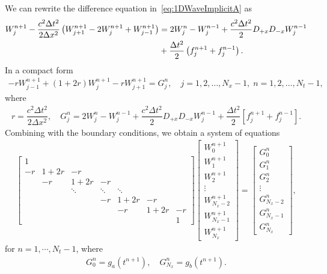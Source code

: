 \documentclass[11pt]{article}
\begin{document}
We can rewrite the difference equation in~\eqref{eq:1DWaveImplicitA} as
\begin{align}
W_j^{n+1}-\dfrac{c^2\Delta t^2}{2 \Delta x^2}\left (W_{j+1}^{n+1}-2W_{j}^{n+1}+W_{j-1}^{n+1}\right) & = 2W_j^n-W_j^{n-1}+\dfrac{c^2\Delta t^2}{2} D_{+x}D_{-x}W_j^{n-1}\\
&+\dfrac{\Delta t^2}{2}\left(f_j^{n+1}+f_{j}^{n-1}\right). \notag
\end{align}
In a compact form
\begin{align}
-rW_{j-1}^{n+1}+(1+2r)W_j^{n+1}-rW_{j+1}^{n+1}=G_j^n, \quad j=1,2,\dots,N_x-1,\; n=1,2,\dots,N_t-1,
\end{align}
where
\begin{align*}
r=\dfrac{c^2\Delta t^2}{2\Delta x^2},\quad G_j^n=2W_j^n-W_j^{n-1}+\dfrac{c^2\Delta t^2}{2} D_{+x}D_{-x}W_j^{n-1}+\dfrac{\Delta t^2}{2}\left[f_j^{n+1}+f_{j}^{n-1}\right].
\end{align*}
Combining with the boundary conditions, we obtain a system of equations
\begin{align}
\label{eq:1DWaveImplicitSystem}
\begin{bmatrix}
1 & & & & & & \\
-r & 1+2r & -r & & & &\\
& -r & 1+2r & -r & & & \\
& & \ddots & \ddots & \ddots & &\\
& & & -r & 1+2r & -r &\\
& & & & -r & 1+2r & -r\\
& & & & & & 1
\end{bmatrix}\begin{bmatrix}
W_0^{n+1}\\ W_1^{n+1}\\ W_2^{n+1}\\ \vdots \\ W_{N_x-2}^{n+1} \\W_{N_x-1}^{n+1} \\ W_{N_x}^{n+1}
\end{bmatrix}=\begin{bmatrix}
G_0^n \\ G_1^n \\ G_2^n \\ \vdots \\ G_{N_x-2}^n \\ G_{N_x-1}^n \\ G_{N_x}^n
\end{bmatrix},
\end{align}
for $n=1,\cdots, N_t-1$, where
\begin{align}
G_0^n=g_a(t^{n+1}), \quad G_{N_x}^n=g_b(t^{n+1}).
\end{align}
\end{document}
